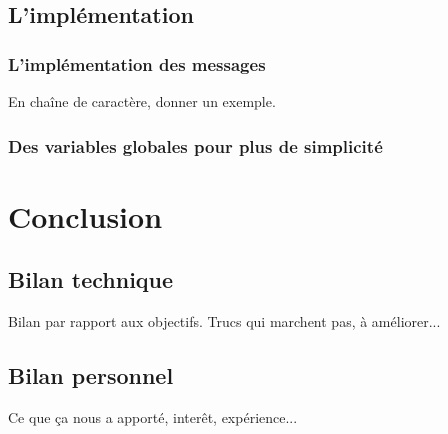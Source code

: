 \documentclass[a4paper,12pt]{article}
\begin{document}
\subsection{L'implémentation}

\subsubsection{L'implémentation des messages}
En chaîne de caractère, donner un exemple.
\subsubsection{Des variables globales pour plus de simplicité}


\newpage

\section{Conclusion}

\subsection{Bilan technique}
Bilan par rapport aux objectifs.
Trucs qui marchent pas, à améliorer...

\subsection{Bilan personnel}
Ce que ça nous a apporté, interêt, expérience...


\end{document}
